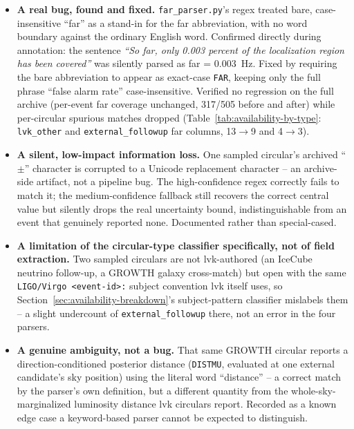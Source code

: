 \begin{itemize}
    \item \textbf{A real bug, found and fixed.} \texttt{far\_parser.py}'s regex treated bare, case-insensitive ``far'' as a stand-in for the \gls{far} abbreviation, with no word boundary against the ordinary English word. Confirmed directly during annotation: the sentence \emph{``So far, only 0.003 percent of the localization region has been covered''} was silently parsed as \gls{far} = 0.003~Hz. Fixed by requiring the bare abbreviation to appear as exact-case \texttt{FAR}, keeping only the full phrase ``false alarm rate'' case-insensitive. Verified no regression on the full archive (per-event \gls{far} coverage unchanged, 317/505 before and after) while per-circular spurious matches dropped (Table~\ref{tab:availability-by-type}: \texttt{lvk\_other} and \texttt{external\_followup} \gls{far} columns, 13$\to$9 and 4$\to$3).
    \item \textbf{A silent, low-impact information loss.} One sampled circular's archived ``$\pm$'' character is corrupted to a Unicode replacement character -- an archive-side artifact, not a pipeline bug. The high-confidence regex correctly fails to match it; the medium-confidence fallback still recovers the correct central value but silently drops the real uncertainty bound, indistinguishable from an event that genuinely reported none. Documented rather than special-cased.
    \item \textbf{A limitation of the circular-type classifier specifically, not of field extraction.} Two sampled circulars are not \gls{lvk}-authored (an IceCube neutrino follow-up, a GROWTH galaxy cross-match) but open with the same \texttt{LIGO/Virgo~\textless event-id\textgreater:} subject convention \gls{lvk} itself uses, so Section~\ref{sec:availability-breakdown}'s subject-pattern classifier mislabels them -- a slight undercount of \texttt{external\_followup} there, not an error in the four parsers.
    \item \textbf{A genuine ambiguity, not a bug.} That same GROWTH circular reports a direction-conditioned posterior distance (\texttt{DISTMU}, evaluated at one external candidate's sky position) using the literal word ``distance'' -- a correct match by the parser's own definition, but a different quantity from the whole-sky-marginalized luminosity distance \gls{lvk} circulars report. Recorded as a known edge case a keyword-based parser cannot be expected to distinguish.
\end{itemize}

